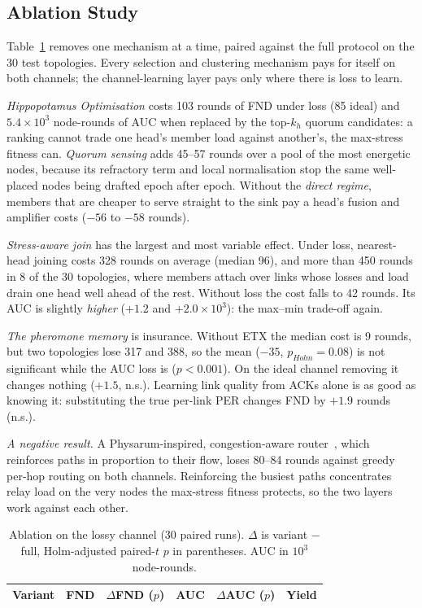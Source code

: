 \subsection{Ablation Study}
Table~\ref{tab:abl} removes one mechanism at a time, paired against the full protocol on the 30 test topologies. Every selection and clustering mechanism pays for itself on both channels; the channel-learning layer pays only where there is loss to learn.

\emph{Hippopotamus Optimisation} costs 103 rounds of FND under loss (85 ideal) and $5.4\times10^3$ node-rounds of AUC when replaced by the top-$k_h$ quorum candidates: a ranking cannot trade one head's member load against another's, the max-stress fitness can. \emph{Quorum sensing} adds 45--57 rounds over a pool of the most energetic nodes, because its refractory term and local normalisation stop the same well-placed nodes being drafted epoch after epoch. Without the \emph{direct regime}, members that are cheaper to serve straight to the sink pay a head's fusion and amplifier costs ($-56$ to $-58$ rounds).

\emph{Stress-aware join} has the largest and most variable effect. Under loss, nearest-head joining costs 328 rounds on average (median 96), and more than 450 rounds in 8 of the 30 topologies, where members attach over links whose losses and load drain one head well ahead of the rest. Without loss the cost falls to 42 rounds. Its AUC is slightly \emph{higher} ($+1.2$ and $+2.0\times10^3$): the max--min trade-off again.

\emph{The pheromone memory} is insurance. Without ETX the median cost is 9 rounds, but two topologies lose 317 and 388, so the mean ($-35$, $p_{Holm}=0.08$) is not significant while the AUC loss is ($p<0.001$). On the ideal channel removing it changes nothing ($+1.5$, n.s.). Learning link quality from ACKs alone is as good as knowing it: substituting the true per-link PER changes FND by $+1.9$ rounds (n.s.).

\emph{A negative result.} A Physarum-inspired, congestion-aware router~\cite{tero2007physarum}, which reinforces paths in proportion to their flow, loses 80--84 rounds against greedy per-hop routing on both channels. Reinforcing the busiest paths concentrates relay load on the very nodes the max-stress fitness protects, so the two layers work against each other.

\begin{table}[t]
\caption{Ablation on the lossy channel (30 paired runs). $\Delta$ is variant $-$ full, Holm-adjusted paired-$t$ $p$ in parentheses. AUC in $10^3$ node-rounds.}
\label{tab:abl}
\centering\footnotesize
\setlength{\tabcolsep}{2.4pt}
\begin{tabular}{@{}lrrrrr@{}}
\toprule
Variant & FND & $\Delta$FND ($p$) & AUC & $\Delta$AUC ($p$) & Yield\\
\midrule

\bottomrule
\end{tabular}
\end{table}
